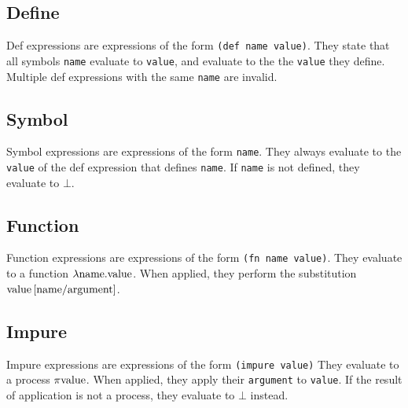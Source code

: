 \documentclass{article}
\begin{document}
    \begin{multicols}{2}
        \subsection{Define}\label{subsec:def}

        Def expressions are expressions of the form \lstinline$(def name value)$.
        They state that all symbols \lstinline$name$ evaluate to \lstinline$value$, and evaluate to the the \lstinline$value$ they define.
        Multiple def expressions with the same \lstinline$name$ are invalid.
        \newline

        \subsection{Symbol}\label{subsec:symbol}

        Symbol expressions are expressions of the form \lstinline$name$.
        They always evaluate to the \lstinline$value$ of the def expression that defines \lstinline$name$.
        If \lstinline$name$ is not defined, they evaluate to $\bot$.
        \newline

        \subsection{Function}\label{subsec:function}

        Function expressions are expressions of the form \lstinline$(fn name value)$.
        They evaluate to a function $\lambda\lstinline{name}.\lstinline{value}$.
        When applied, they perform the substitution $\lstinline{value}\left[\lstinline{name}/\lstinline{argument}\right]$.
        \newline

        \subsection{Impure}\label{subsec:do}

        Impure expressions are expressions of the form \lstinline$(impure value)$
        They evaluate to a process $\pi\lstinline{value}$.
        When applied, they apply their \lstinline$argument$ to \lstinline$value$.
        If the result of application is not a process, they evaluate to $\bot$ instead.
        \newline


\end{multicols}
\end{document}
